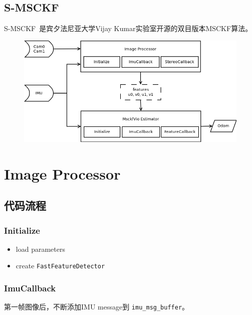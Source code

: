 \documentclass[12pt,a4paper]{article}
\begin{document}
\subsection{S-MSCKF}

S-MSCKF~\cite{sun2018robust}是宾夕法尼亚大学Vijay Kumar实验室开源的双目版本MSCKF算法。


\begin{figure}[!htbp]
\centering
\includegraphics[scale=0.5]{images/msckf_vio_io.png}
\end{figure}

\newpage
\section{Image Processor}

\subsection{代码流程}

\subsubsection{Initialize}

\begin{itemize}
\item load parameters
\item create \verb|FastFeatureDetector|
\end{itemize}

\subsubsection{ImuCallback}

第一帧图像后，不断添加IMU message到 \verb|imu_msg_buffer|。
\end{document}
